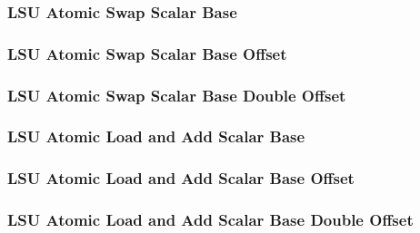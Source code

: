 \subsubsection[{\small LSU Atomic Swap Scalar Base}]{LSU Atomic Swap Scalar Base} \label{sec:format-LSU-ASWAPSB}



\subsubsection[{\small LSU Atomic Swap Scalar Base Offset}]{LSU Atomic Swap Scalar Base Offset} \label{sec:format-LSU-ASWAPSB.O}



\subsubsection[{\small LSU Atomic Swap Scalar Base Double Offset}]{LSU Atomic Swap Scalar Base Double Offset} \label{sec:format-LSU-ASWAPSB.D}



\subsubsection[{\small LSU Atomic Load and Add Scalar Base}]{LSU Atomic Load and Add Scalar Base} \label{sec:format-LSU-ALADDSB}



\subsubsection[{\small LSU Atomic Load and Add Scalar Base Offset}]{LSU Atomic Load and Add Scalar Base Offset} \label{sec:format-LSU-ALADDSB.O}



\subsubsection[{\small LSU Atomic Load and Add Scalar Base Double Offset}]{LSU Atomic Load and Add Scalar Base Double Offset} \label{sec:format-LSU-ALADDSB.D}

